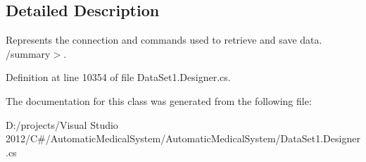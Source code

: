 \subsection{Detailed Description}
Represents the connection and commands used to retrieve and save data. /summary$>$. 

Definition at line 10354 of file DataSet1.Designer.cs.

The documentation for this class was generated from the following file:\begin{CompactItemize}
\item 
D:/projects/Visual Studio 2012/C\#/AutomaticMedicalSystem/AutomaticMedicalSystem/DataSet1.Designer.cs\end{CompactItemize}
